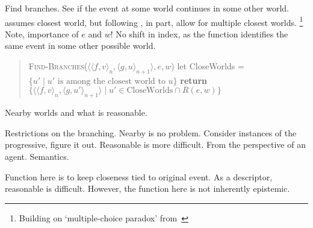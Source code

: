 \begin{note}
  Find branches.
  See if the event at some world continues in some other world.
  \citeauthor{Landman:1992wh} assumes closest world, but following \textcite[37]{Szabo:2004ul}, in part, allow for multiple closest worlds.%
  \footnote{
    Building on `multiple-choice paradox' from~\textcite{Bonomi:1997uq}
  }
  Note, importance of \(e\) and \(w\)!
  No shift in index, as the function identifies the same event in some other possible world.

  \begin{quote}
    \textsc{Find-Branches}(\(\langle \langle f,v \rangle_{n}, \langle g,u \rangle_{n+1}\rangle, e, w\))\newline
    let CloseWorlds = \(\{u' \mid u' \text{ is among the closest world to } u\}\)\newline
    \textbf{return} \(\{ \langle \langle f,v \rangle_{n}, \langle g,u' \rangle_{n+1}\rangle \mid u' \in \text{CloseWorlds} \cap R(e,w)\}\)
  \end{quote}
\end{note}

\begin{note}[Reasonable]
  Nearby worlds and what is reasonable.

  Restrictions on the branching.
  Nearby is no problem.
  Consider instances of the progressive, figure it out.
  Reasonable is more difficult.
  From the perspective of an agent.
  Semantics.

  Function here is to keep closeness tied to original event.
  As a descriptor, reasonable is difficult.
  However, the function here is not inherently epistemic.
\end{note}

